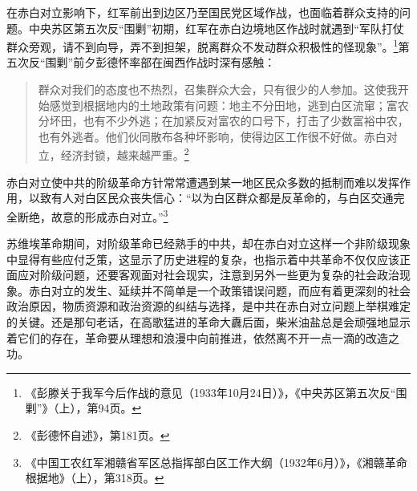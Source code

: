 在赤白对立影响下，红军前出到边区乃至国民党区域作战，也面临着群众支持的问题。中央苏区第五次反“围剿”初期，红军在赤白边境地区作战时就遇到“军队打仗群众旁观，请不到向导，弄不到担架，脱离群众不发动群众积极性的怪现象”。\footnote{《彭滕关于我军今后作战的意见（1933年10月24日）》，《中央苏区第五次反“围剿”》（上），第94页。}第五次反“围剿”前夕彭德怀率部在闽西作战时深有感触：

\begin{quote}

群众对我们的态度也不热烈，召集群众大会，只有很少的人参加。这使我开始感觉到根据地内的土地政策有问题：地主不分田地，逃到白区流窜；富农分坏田，也有不少外逃；在加紧反对富农的口号下，打击了少数富裕中农，也有外逃者。他们伙同散布各种坏影响，使得边区工作很不好做。赤白对立，经济封锁，越来越严重。\footnote{《彭德怀自述》，第181页。}
\end{quote}


赤白对立使中共的阶级革命方针常常遭遇到某一地区民众多数的抵制而难以发挥作用，以致有人对白区民众丧失信心：“以为白区群众都是反革命的，与白区交通完全断绝，故意的形成赤白对立。”\footnote{《中国工农红军湘赣省军区总指挥部白区工作大纲（1932年6月）》，《湘赣革命根据地》（上），第318页。}


苏维埃革命期间，对阶级革命已经熟手的中共，却在赤白对立这样一个非阶级现象中显得有些应付乏策，这显示了历史进程的复杂，也指示着中共革命不仅仅应该正面应对阶级问题，还要客观面对社会现实，注意到另外一些更为复杂的社会政治现象。赤白对立的发生、延续并不简单是一个政策错误问题，而应有着更深刻的社会政治原因，物质资源和政治资源的纠结与选择，是中共在赤白对立问题上举棋难定的关键。还是那句老话，在高歌猛进的革命大纛后面，柴米油盐总是会顽强地显示着它们的存在，革命要从理想和浪漫中向前推进，依然离不开一点一滴的改造之功。

